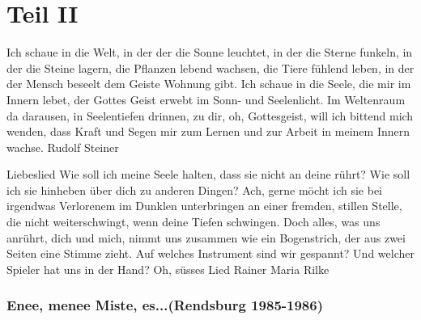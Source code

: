 
\part*{Teil II}



Ich schaue in die Welt,
in der der die Sonne leuchtet,
in der die Sterne funkeln,
in der die Steine lagern,
die Pflanzen lebend wachsen, 
die Tiere fühlend leben, 
in der der Mensch beseelt
dem Geiste Wohnung gibt.
Ich schaue in die Seele,
 die mir im Innern lebet, 
der Gottes Geist erwebt
im Sonn- und Seelenlicht.
Im Weltenraum da darausen,
in Seelentiefen drinnen, 
zu dir, oh, Gottesgeist,
will ich bittend mich wenden,
dass Kraft und Segen mir
zum Lernen und zur Arbeit
in meinem Innern wachse.  
Rudolf Steiner

Liebeslied
Wie soll ich meine Seele halten, dass
sie nicht an deine rührt? Wie soll ich sie
hinheben über dich zu anderen Dingen?
Ach, gerne möcht ich sie bei irgendwas
Verlorenem im Dunklen unterbringen
an einer fremden, stillen Stelle, die
nicht weiterschwingt, wenn deine Tiefen schwingen.
Doch alles, was uns anrührt, dich und mich,
nimmt uns zusammen wie ein Bogenstrich,
der aus zwei Seiten eine Stimme zieht.
Auf welches Instrument sind wir gespannt?
Und welcher Spieler hat uns in der Hand?
Oh, süsses Lied
Rainer Maria Rilke


\section*{Enee, menee Miste, es...(Rendsburg 1985-1986)}





